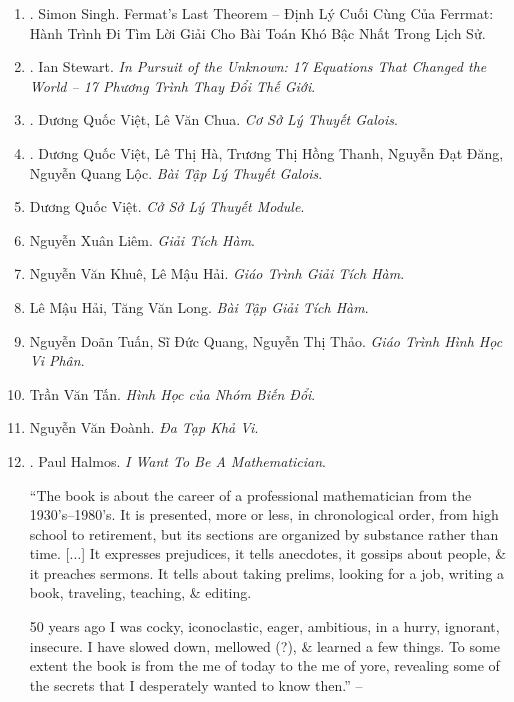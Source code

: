 \documentclass{article}
\begin{document}
\begin{enumerate}
	\item \cite{Singh_last_Fermat_thm_VN}. {\sc Simon Singh}. {Fermat's Last Theorem -- Định Lý Cuối Cùng Của Ferrmat: Hành Trình Đi Tìm Lời Giải Cho Bài Toán Khó Bậc Nhất Trong Lịch Sử}.\hfill{\sf[done]}

    \item \cite{Stewart_equation_VN}. {\sc Ian Stewart}. {\it In Pursuit of the Unknown: 17 Equations That Changed the World -- 17 Phương Trình Thay Đổi Thế Giới}.\hfill{\sf[done]}

	\item \cite{Viet_Chua2022}. Dương Quốc Việt, Lê Văn Chua. {\it Cơ Sở Lý Thuyết Galois}.\hfill{\sf[reading]}

	\item \cite{Viet_Ha_Thanh_Dang_Loc2022}. Dương Quốc Việt, Lê Thị Hà, Trương Thị Hồng Thanh, Nguyễn Đạt Đăng, Nguyễn Quang Lộc. {\it Bài Tập Lý Thuyết Galois}.\hfill{\sf[reading]}
	\item Dương Quốc Việt. {\it Cở Sở Lý Thuyết Module}.

	\item Nguyễn Xuân Liêm. {\it Giải Tích Hàm}.

	\item Nguyễn Văn Khuê, Lê Mậu Hải. {\it Giáo Trình Giải Tích Hàm}.

	\item Lê Mậu Hải, Tăng Văn Long. {\it Bài Tập Giải Tích Hàm}.

	\item Nguyễn Doãn Tuấn, Sĩ Đức Quang, Nguyễn Thị Thảo. {\it Giáo Trình Hình Học Vi Phân}.

	\item Trần Văn Tấn. {\it Hình Học của Nhóm Biến Đổi}.

	\item Nguyễn Văn Đoành. {\it Đa Tạp Khả Vi}.

	\item \cite{Halmos1985}. {\sc Paul Halmos}. {\it I Want To Be A Mathematician}.

	``The book is about the career of a professional mathematician from the 1930's--1980's. It is presented, more or less, in chronological order, from high school to retirement, but its sections are organized by substance rather than time. [$\ldots$] It expresses prejudices, it tells anecdotes, it gossips about people, \& it preaches sermons. It tells about taking prelims, looking for a job, writing a book, traveling, teaching, \& editing.

	50 years ago I was cocky, iconoclastic, eager, ambitious, in a hurry, ignorant, insecure. I have slowed down, mellowed (?), \& learned a few things. To some extent the book is from the me of today to the me of yore, revealing some of the secrets that I desperately wanted to know then.'' -- \cite[Overture]{Halmos1985}


\end{enumerate}
\end{document}
